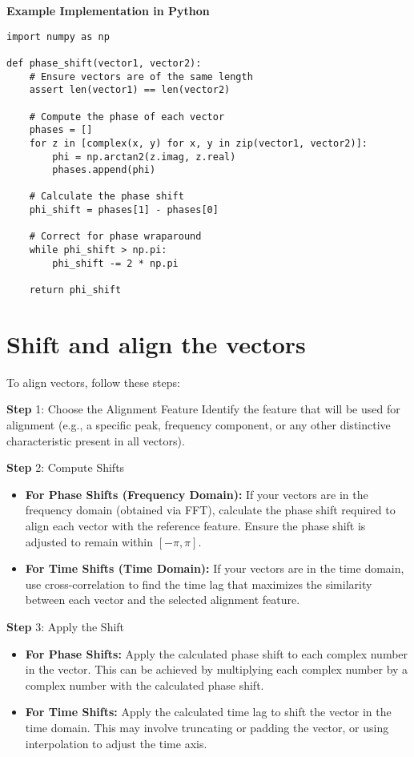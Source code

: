 \documentclass[twocolumn]{article}
\begin{document}
\noindent \textbf{Example Implementation in Python}
\begin{lstlisting}[style=Python]
import numpy as np

def phase_shift(vector1, vector2):
    # Ensure vectors are of the same length
    assert len(vector1) == len(vector2)

    # Compute the phase of each vector
    phases = []
    for z in [complex(x, y) for x, y in zip(vector1, vector2)]:
        phi = np.arctan2(z.imag, z.real)
        phases.append(phi)

    # Calculate the phase shift
    phi_shift = phases[1] - phases[0]

    # Correct for phase wraparound
    while phi_shift > np.pi:
        phi_shift -= 2 * np.pi

    return phi_shift
\end{lstlisting}


\section{Shift and align the vectors}
To align vectors, follow these steps:


\noindent \textbf{Step} 1: Choose the Alignment Feature
Identify the feature that will be used for alignment (e.g., a specific peak, frequency component, or any other distinctive characteristic present in all
vectors).

\noindent \textbf{Step} 2: Compute Shifts

\begin{itemize}
\item \textbf{For Phase Shifts (Frequency Domain):}
If your vectors are in the frequency domain (obtained via FFT), calculate the phase shift required to align each vector with the reference feature.
Ensure the phase shift is adjusted to remain within $[-\pi , \pi ]$.
\item \textbf{For Time Shifts (Time Domain):}
If your vectors are in the time domain, use cross-correlation to find the time lag that maximizes the similarity between each vector and the selected
alignment feature.
\end{itemize}

\noindent \textbf{Step} 3: Apply the Shift

\begin{itemize}

\item \textbf{For Phase Shifts:}
Apply the calculated phase shift to each complex number in the vector. This can be achieved by multiplying each complex number by a complex number with
the calculated phase shift.

\item \textbf{For Time Shifts:}
Apply the calculated time lag to shift the vector in the time domain. This may involve truncating or padding the vector, or using interpolation to adjust
the time axis.

\end{itemize}
\end{document}
